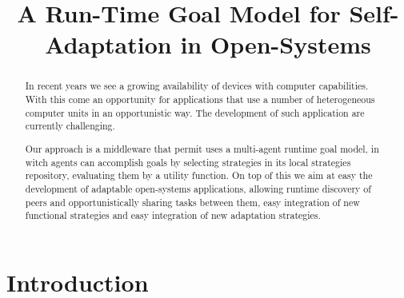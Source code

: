 \documentclass[mestrado]{pacotes/unb-cic}
\title{A Run-Time Goal Model for Self-Adaptation in Open-Systems}
\begin{document}
\maketitle

\pretextual



\begin{abstract}\textbf{}

  In recent years we see a growing availability of devices with computer capabilities. With this come an opportunity for applications that use a number of heterogeneous computer units in an opportunistic way. The development of such application are currently challenging.


  Our approach is a middleware that permit uses a  multi-agent runtime goal model, in witch agents can accomplish goals by selecting strategies in its local strategies repository, evaluating them by a utility function. On top of this we aim at easy the development of adaptable open-systems applications, allowing runtime discovery of peers and opportunistically sharing tasks between them, easy integration of new functional strategies and easy integration of new adaptation strategies.

\end{abstract}

\tableofcontents
\listoffigures

\textual

\chapter{Introduction}





\end{document}
